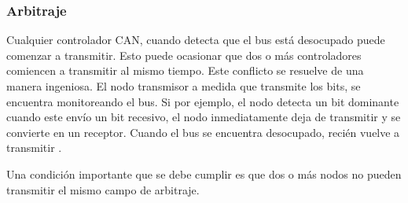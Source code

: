 \subsubsection{Arbitraje}
Cualquier controlador CAN, cuando detecta que el bus está desocupado puede comenzar a transmitir. Esto puede ocasionar que dos o más controladores comiencen a transmitir al mismo tiempo. Este conflicto se resuelve de una manera ingeniosa. El nodo transmisor a medida que transmite los bits, se encuentra monitoreando el bus. Si por ejemplo, el nodo detecta un bit dominante cuando este envío un bit recesivo, el nodo inmediatamente deja de transmitir y se convierte en un receptor. Cuando el bus se encuentra desocupado, recién vuelve a transmitir \citep{kvaserWEB}.

Una condición importante que se debe cumplir es que dos o más nodos no pueden transmitir el mismo campo de arbitraje.
